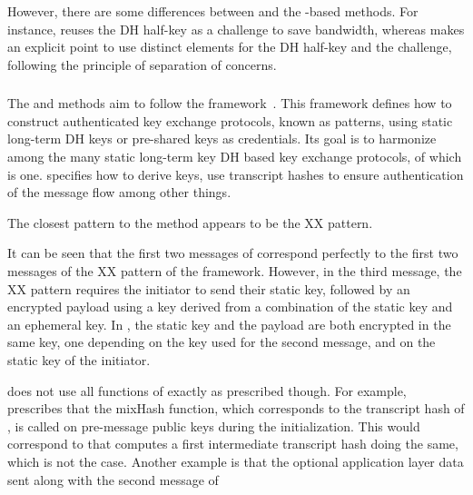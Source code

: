 %
%
However, there are some differences between \mOptls{} and the \mStat{}-based methods. For instance, \mEdhoc{} reuses the DH half-key as a challenge to save bandwidth, whereas \mOptls{} makes an explicit
point to use distinct elements for the DH half-key and the
challenge, following the principle of separation of concerns.
%

\subsubsection{\mNoise{}}
The \mStatStat{} and \mPskPsk{} methods aim to follow the \mNoise{}
framework~\cite{perrin2016noise}.
%
This framework defines how to construct authenticated key exchange protocols,
known as patterns, using static long-term DH keys or pre-shared
keys as credentials.
%
Its goal is to harmonize among the many static long-term key DH 
based key exchange protocols, of which \mOptls{} is one.
%
\mNoise{} specifies how to derive keys, use transcript hashes to ensure
authentication of the message flow among other things.
%

The closest \mNoise{} pattern to the \mStatStat{} method appears to be the
XX pattern.
%

{\color{blue}
It can be seen that the first two messages of \mStatStat{}
correspond perfectly to the first two messages of the XX pattern of
the \mNoise{} framework.
%
However, in the third message, the XX pattern requires
the initiator to send their static key, followed by an encrypted payload using a
key derived from a combination of the static key and an ephemeral key.
%
In \mEdhoc{}, the static key and the payload are both encrypted in the same key, one depending on the key used for the second message, and on the static key of the initiator.
}

\mEdhoc{} does not use all functions of \mNoise{} exactly as prescribed though.
%
For example, \mNoise{} prescribes that the mixHash function, which corresponds
to the transcript hash of \mEdhoc{}, is called on pre-message public keys
during the initialization.
%
This would correspond to that \mEdhoc{} computes a first intermediate transcript
hash doing the same, which is not the case.
%
Another example is that the optional application layer data sent along with
the second message of \mNoise{}

